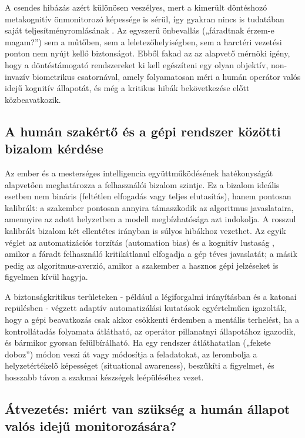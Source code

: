 \documentclass[12pt,a4paper,oneside]{book}
\begin{document}
A csendes hibázás azért különösen veszélyes, mert a kimerült döntéshozó metakognitív önmonitorozó képessége is sérül, így gyakran nincs is tudatában saját teljesítményromlásának \cite{tanveer2026}. Az egyszerű önbevallás („fáradtnak érzem-e magam?”) sem a műtőben, sem a leletezőhelyiségben, sem a harctéri vezetési ponton nem nyújt kellő biztonságot. Ebből fakad az az alapvető mérnöki igény, hogy a döntéstámogató rendszereket ki kell egészíteni egy olyan objektív, non-invazív biometrikus csatornával, amely folyamatosan méri a humán operátor valós idejű kognitív állapotát, és még a kritikus hibák bekövetkezése előtt közbeavatkozik.

\subsection{A humán szakértő és a gépi rendszer közötti bizalom kérdése}

Az ember és a mesterséges intelligencia együttműködésének hatékonyságát alapvetően meghatározza a felhasználói bizalom szintje. Ez a bizalom ideális esetben nem bináris (feltétlen elfogadás vagy teljes elutasítás), hanem pontosan kalibrált: a szakember pontosan annyira támaszkodik az algoritmus javaslataira, amennyire az adott helyzetben a modell megbízhatósága azt indokolja. A rosszul kalibrált bizalom két ellentétes irányban is súlyos hibákhoz vezethet. Az egyik véglet az automatizációs torzítás (automation bias) és a kognitív lustaság \cite{tanveer2026}, amikor a fáradt felhasználó kritikátlanul elfogadja a gép téves javaslatát; a másik pedig az algoritmus-averzió, amikor a szakember a hasznos gépi jelzéseket is figyelmen kívül hagyja.

A biztonságkritikus területeken - például a légiforgalmi irányításban és a katonai repülésben - végzett adaptív automatizálási kutatások egyértelműen igazolták, hogy a gépi beavatkozás csak akkor csökkenti érdemben a mentális terhelést, ha a kontrollátadás folyamata átlátható, az operátor pillanatnyi állapotához igazodik, és bármikor gyorsan felülbírálható. Ha egy rendszer átláthatatlan („fekete doboz”) módon veszi át vagy módosítja a feladatokat, az lerombolja a helyzetértékelő képességet (situational awareness), beszűkíti a figyelmet, és hosszabb távon a szakmai készségek leépüléséhez vezet.

\subsection{Átvezetés: miért van szükség a humán állapot valós idejű monitorozására?}
\end{document}
